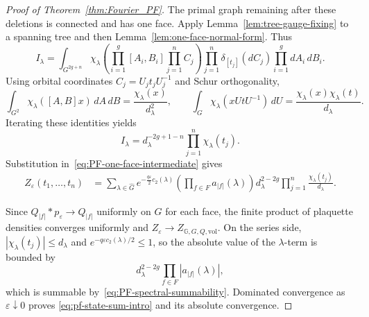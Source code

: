 \documentclass[10pt,a4paper]{amsart}
\newcommand\vol{\mathrm{vol}}
\begin{document}
\begin{proof}[Proof of Theorem~\ref{thm:Fourier_PF}]
The primal graph remaining after these deletions is connected and has one
face. Apply Lemma~\ref{lem:tree-gauge-fixing} to a spanning tree and then
Lemma~\ref{lem:one-face-normal-form}. Thus
\[
 I_\lambda
 =
 \int_{G^{2g+n}}
 \chi_\lambda\!\left(
 \prod_{i=1}^g[A_i,B_i]\prod_{j=1}^n C_j
 \right)
 \prod_{j=1}^n\delta_{[t_j]}(dC_j)
 \prod_{i=1}^g dA_i\,dB_i.
\]
Using orbital coordinates $C_j=U_jt_jU_j^{-1}$ and Schur orthogonality,
\[
 \int_{G^2}\chi_\lambda([A,B]x)\,dA\,dB
 =\frac{\chi_\lambda(x)}{d_\lambda^2},
 \qquad
 \int_G\chi_\lambda(xUtU^{-1})\,dU
 =\frac{\chi_\lambda(x)\chi_\lambda(t)}{d_\lambda}.
\]
Iterating these identities yields
\[
 I_\lambda
 =d_\lambda^{-2g+1-n}
 \prod_{j=1}^n\chi_\lambda(t_j).
\]
Substitution in~\eqref{eq:PF-one-face-intermediate} gives
\begin{align*}
 Z_\varepsilon(t_1,\ldots,t_n)
 &=
 \sum_{\lambda\in\widehat G}
 e^{-\frac{q\varepsilon}{2}c_2(\lambda)}
 \left(\prod_{f\in F}a_{|f|}(\lambda)\right)
 d_\lambda^{2-2g}
 \prod_{j=1}^n\frac{\chi_\lambda(t_j)}{d_\lambda}.
\end{align*}

Since $Q_{|f|}*p_\varepsilon\to Q_{|f|}$ uniformly on $G$ for each
face, the finite product of plaquette densities converges uniformly and
$Z_\varepsilon\to Z_{\mathbb G,G,Q,\vol}$. On the series side,
$|\chi_\lambda(t_j)|\leq d_\lambda$ and
$e^{-q\varepsilon c_2(\lambda)/2}\leq1$, so the absolute value of the
$\lambda$-term is bounded by
\[
 d_\lambda^{2-2g}
 \prod_{f\in F}|a_{|f|}(\lambda)|,
\]
which is summable by~\eqref{eq:PF-spectral-summability}. Dominated
convergence as $\varepsilon\downarrow0$ proves
\eqref{eq:pf-state-sum-intro} and its absolute convergence.
\end{proof}
\end{document}
